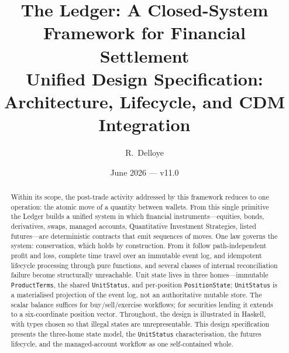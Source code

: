 \documentclass[11pt,a4paper]{article}
\title{The Ledger: A Closed-System Framework for Financial Settlement\\[6pt]
\large Unified Design Specification: Architecture, Lifecycle, and CDM Integration}
\author{R.\ Delloye}
\date{June 2026 --- v11.0}
\begin{document}
\maketitle

\begin{abstract}
Within its scope, the post-trade activity addressed by this framework reduces to one operation: the
atomic move of a quantity between wallets. From this single primitive the Ledger builds a unified system
in which financial instruments---equities, bonds, derivatives, swaps, managed accounts, Quantitative
Investment Strategies, listed futures---are deterministic contracts that emit sequences of moves. One law
governs the system: conservation, which holds by construction. From it follow path-independent profit and
loss, complete time travel over an immutable event log, and idempotent lifecycle processing through pure
functions, and several classes of internal reconciliation failure become structurally unreachable. Unit
state lives in three homes---immutable \texttt{ProductTerms}, the shared \texttt{UnitStatus}, and
per-position \texttt{PositionState}; \texttt{UnitStatus} is a materialised projection of the event log,
not an authoritative mutable store. The scalar balance suffices for buy/sell/exercise workflows; for
securities lending it extends to a six-coordinate position vector. Throughout, the design is illustrated
in Haskell, with types chosen so that illegal states are unrepresentable. This design
specification presents the three-home state model, the \texttt{UnitStatus} characterisation,
the futures lifecycle, and the managed-account workflow as one self-contained whole.
\end{abstract}

\tableofcontents
\clearpage






















\appendix









\end{document}
